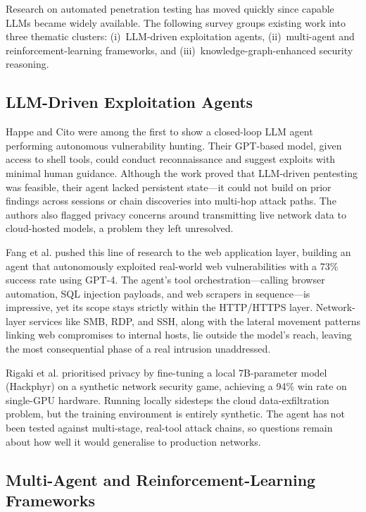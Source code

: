 \documentclass[conference]{IEEEtran}
\begin{document}
Research on automated penetration testing has moved quickly since capable LLMs became widely available. The following survey groups existing work into three thematic clusters: (i)~LLM-driven exploitation agents, (ii)~multi-agent and reinforcement-learning frameworks, and (iii)~knowledge-graph-enhanced security reasoning.

\subsection{LLM-Driven Exploitation Agents}

Happe and Cito \cite{happe2023pwnd} were among the first to show a closed-loop LLM agent performing autonomous vulnerability hunting. Their GPT-based model, given access to shell tools, could conduct reconnaissance and suggest exploits with minimal human guidance. Although the work proved that LLM-driven pentesting was feasible, their agent lacked persistent state---it could not build on prior findings across sessions or chain discoveries into multi-hop attack paths. The authors also flagged privacy concerns around transmitting live network data to cloud-hosted models, a problem they left unresolved.

Fang et al. \cite{fang2024hack} pushed this line of research to the web application layer, building an agent that autonomously exploited real-world web vulnerabilities with a 73\% success rate using GPT-4. The agent's tool orchestration---calling browser automation, SQL injection payloads, and web scrapers in sequence---is impressive, yet its scope stays strictly within the HTTP/HTTPS layer. Network-layer services like SMB, RDP, and SSH, along with the lateral movement patterns linking web compromises to internal hosts, lie outside the model's reach, leaving the most consequential phase of a real intrusion unaddressed.

Rigaki et al. \cite{rigaki2024hackphyr} prioritised privacy by fine-tuning a local 7B-parameter model (Hackphyr) on a synthetic network security game, achieving a 94\% win rate on single-GPU hardware. Running locally sidesteps the cloud data-exfiltration problem, but the training environment is entirely synthetic. The agent has not been tested against multi-stage, real-tool attack chains, so questions remain about how well it would generalise to production networks.

\subsection{Multi-Agent and Reinforcement-Learning Frameworks}
\end{document}
